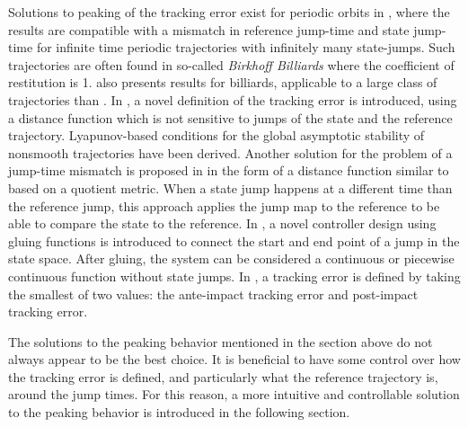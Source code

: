 \documentclass[../DC2019003Bouma.tex]{subfiles}
\begin{document}
Solutions to peaking of the tracking error exist for periodic orbits in \cite{Menini2001,Galeani2008}, where the results are compatible with a mismatch in reference jump-time and state jump-time for infinite time periodic trajectories with infinitely many state-jumps. Such trajectories are often found in so-called \textit{Birkhoff Billiards} where the coefficient of restitution is 1. \cite{Forni2013} also presents results for billiards, applicable to a large class of trajectories than \cite{Menini2001,Galeani2008}. In \cite{Biemond2013,Biemond2016}, a novel definition of the tracking error is introduced, using a distance function which is not sensitive to jumps of the state and the reference trajectory. Lyapunov-based conditions for the global asymptotic stability of nonsmooth trajectories have been derived. Another solution for the problem of a jump-time mismatch is proposed in \cite{Baumann2018} in the form of a distance function similar to \cite{Biemond2013,Biemond2016} based on a quotient metric. When a state jump happens at a different time than the reference jump, this approach applies the jump map to the reference to be able to compare the state to the reference. In \cite{Kim2016}, a novel controller design using gluing functions is introduced to connect the start and end point of a jump in the state space. After gluing, the system can be considered a continuous or piecewise continuous function without state jumps. In \cite{Yang2017}, a tracking error is defined by taking the smallest of two values: the ante-impact tracking error and post-impact tracking error.

The solutions to the peaking behavior mentioned in the section above do not always appear to be the best choice. It is beneficial to have some control over how the tracking error is defined, and particularly what the reference trajectory is, around the jump times. For this reason, a more intuitive and controllable solution to the peaking behavior is introduced in the following section.
\end{document}
